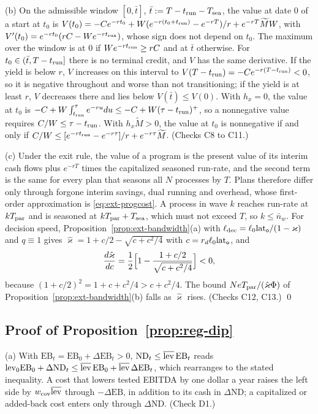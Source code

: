 (b) On the admissible window $[0,\bar t]$, $\bar t:=T-t_{\rm run}-T_{\rm sea}$, the value at date 0 of a start at $t_0$ is $V(t_0)=-Ce^{-rt_0}+W(e^{-r(t_0+t_{\rm run})}-e^{-rT})/r+e^{-rT}\widetilde MW$, with $V'(t_0)=e^{-rt_0}(rC-We^{-rt_{\rm run}})$, whose sign does not depend on $t_0$. The maximum over the window is at $0$ if $We^{-rt_{\rm run}}\ge rC$ and at $\bar t$ otherwise. For $t_0\in(\bar t,T-t_{\rm run}]$ there is no terminal credit, and $V$ has the same derivative. If the yield is below $r$, $V$ increases on this interval to $V(T-t_{\rm run})=-Ce^{-r(T-t_{\rm run})}<0$, so it is negative throughout and worse than not transitioning; if the yield is at least $r$, $V$ decreases there and lies below $V(\bar t)\le V(0)$. With $h_x=0$, the value at $t_0$ is $-C+W\int_{t_{\rm run}}^\tau e^{-ru}du\le-C+W(\tau-t_{\rm run})^+$, so a nonnegative value requires $C/W\le\tau-t_{\rm run}$. With $h_x\widetilde M>0$, the value at $t_0$ is nonnegative if and only if $C/W\le[e^{-rt_{\rm run}}-e^{-r\tau}]/r+e^{-r\tau}\widetilde M$. (Checks C8 to C11.)

(c) Under the exit rule, the value of a program is the present value of its interim cash flows plus $e^{-rT}$ times the capitalized seasoned run-rate, and the second term is the same for every plan that seasons all $N$ processes by $T$. Plans therefore differ only through forgone interim savings, dual running and overhead, whose first-order approximation is \eqref{eq:ext-progcost}. A process in wave $k$ reaches run-rate at $kT_{\rm par}$ and is seasoned at $kT_{\rm par}+T_{\rm sea}$, which must not exceed $T$, so $k\le\bar n_w$. For decision speed, Proposition~\ref{prop:ext-bandwidth}(a) with $\ell_{\rm dec}=\ell_0{\rm lat}_{\mathsf o}/(1-\varkappa)$ and $q\equiv1$ gives $\hat\varkappa=1+c/2-\sqrt{c+c^2/4}$ with $c=r_d\ell_0{\rm lat}_{\mathsf o}$, and
\[
\frac{d\hat\varkappa}{dc}=\frac12\Bigl[1-\frac{1+c/2}{\sqrt{c+c^2/4}}\Bigr]<0,
\]
because $(1+c/2)^2=1+c+c^2/4>c+c^2/4$. The bound $NeT_{\rm par}/(\hat\varkappa\Phi)$ of Proposition~\ref{prop:ext-bandwidth}(b) falls as $\hat\varkappa$ rises. (Checks C12, C13.) \qed

\subsection*{Proof of Proposition~\ref{prop:reg-dip}}

(a) With $\mathrm{EB}_t=\mathrm{EB}_0+\Delta\mathrm{EB}_t>0$, $\mathrm{ND}_t\le\overline{\rm lev}\,\mathrm{EB}_t$ reads ${\rm lev}_0\mathrm{EB}_0+\Delta\mathrm{ND}_t\le\overline{\rm lev}\,\mathrm{EB}_0+\overline{\rm lev}\,\Delta\mathrm{EB}_t$, which rearranges to the stated inequality. A cost that lowers tested EBITDA by one dollar a year raises the left side by $w_{\rm cov}\overline{\rm lev}$ through $-\Delta\mathrm{EB}$, in addition to its cash in $\Delta\mathrm{ND}$; a capitalized or added-back cost enters only through $\Delta\mathrm{ND}$. (Check D1.)

